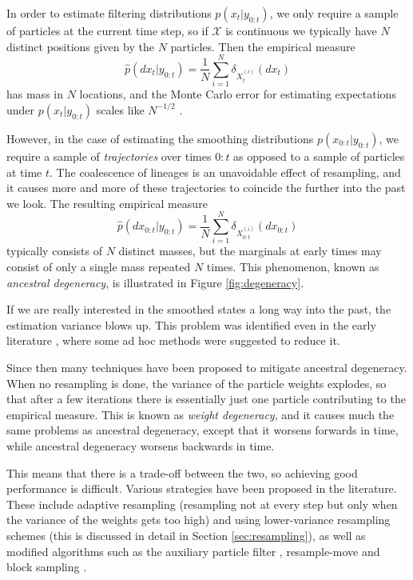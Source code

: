 \documentclass[fleqn]{article}
\theoremstyle{definition}
\begin{document}
In order to estimate filtering distributions $p(x_t | y_{0:t})$, we only require a sample of particles at the current time step, so if $\mathcal{X}$ is continuous we typically have $N$ distinct positions given by the $N$ particles. Then the empirical measure
\begin{equation*}
\hat{p}(dx_{t}|y_{0:t}) = \frac{1}{N} \sum_{i=1}^N \delta_{X_{t}^{(i)}} (dx_{t})
\end{equation*}
has mass in $N$ locations, and the Monte Carlo error for estimating expectations under $p(x_t | y_{0:t})$ scales like $N^{-1/2}$ \citep{doucet2009}.

However, in the case of estimating the smoothing distributions $p(x_{0:t} | y_{0:t})$, we require a sample of \emph{trajectories} over times $0:t$ as opposed to a sample of particles at time $t$.
The coalescence of lineages is an unavoidable effect of resampling, and it causes more and more of these trajectories to coincide the further into the past we look.
The resulting empirical measure
\begin{equation*}
\hat{p}(dx_{0:t}|y_{0:t}) = \frac{1}{N} \sum_{i=1}^N \delta_{X_{0:t}^{(i)}} (dx_{0:t})
\end{equation*}
typically consists of $N$ distinct masses, but the marginals at early times may consist of only a single mass repeated $N$ times.
This phenomenon, known as \emph{ancestral degeneracy}, is illustrated in Figure \ref{fig:degeneracy}.

If we are really interested in the smoothed states a long way into the past, the estimation variance blows up. This problem was identified even in the early literature \citep{gordon1993}, where some ad hoc methods were suggested to reduce it.

Since then many techniques have been proposed to mitigate ancestral degeneracy.
When no resampling is done, the variance of the particle weights explodes, so that  after a few iterations there is essentially just one particle contributing to the empirical measure. This is known as \emph{weight degeneracy}, and it causes much the same problems as ancestral degeneracy, except that it worsens forwards in time, while ancestral degeneracy worsens backwards in time.

This means that there is a trade-off between the two, so achieving good performance is difficult. Various strategies have been proposed in the literature.
These include adaptive resampling (resampling not at every step but only when the variance of the weights gets too high) and using lower-variance resampling schemes (this is discussed in detail in Section \ref{sec:resampling}), as well as modified algorithms such as the auxiliary particle filter \citep{pitt1999}, resample-move \citep{gilks2001} and block sampling \citep{doucet2006}.
\end{document}

